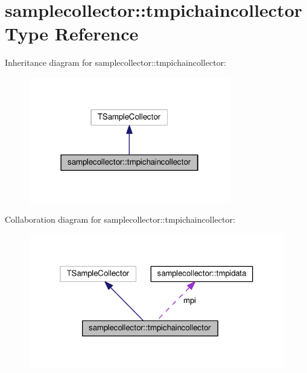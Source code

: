 \hypertarget{structsamplecollector_1_1tmpichaincollector}{}\section{samplecollector\+:\+:tmpichaincollector Type Reference}
\label{structsamplecollector_1_1tmpichaincollector}


Inheritance diagram for samplecollector\+:\+:tmpichaincollector\+:
\nopagebreak
\begin{figure}[H]
\begin{center}
\leavevmode
\includegraphics[width=250pt]{structsamplecollector_1_1tmpichaincollector__inherit__graph}
\end{center}
\end{figure}


Collaboration diagram for samplecollector\+:\+:tmpichaincollector\+:
\nopagebreak
\begin{figure}[H]
\begin{center}
\leavevmode
\includegraphics[width=321pt]{structsamplecollector_1_1tmpichaincollector__coll__graph}
\end{center}
\end{figure}
